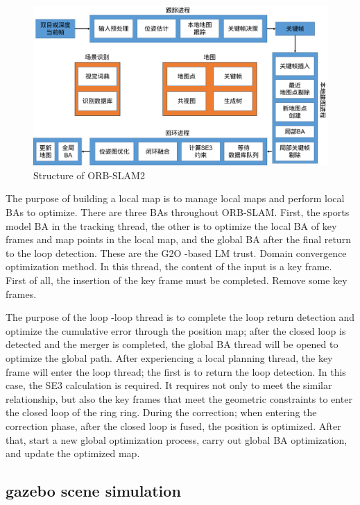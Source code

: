 \documentclass[conference]{IEEEtran}
\begin{document}
\begin{figure}[htbp]
    \centerline{\includegraphics[width=0.9\columnwidth]{ORBstructure.png}}
    \caption{Structure of ORB-SLAM2}
\end{figure}

The purpose of building a local map is to manage local maps and perform local BAs to optimize. 
There are three BAs throughout ORB-SLAM. First, the sports model BA in the tracking thread, 
the other is to optimize the local BA of key frames and map points in the local map, 
and the global BA after the final return to the loop detection. These are the G2O -based LM trust. 
Domain convergence optimization method. In this thread, the content of the input is a key frame. 
First of all, 
the insertion of the key frame must be completed. Remove some key frames.

The purpose of the loop -loop thread is to complete the loop return detection and optimize the cumulative error through the position map; 
after the closed loop is detected and the merger is completed, 
the global BA thread will be opened to optimize the global path. 
After experiencing a local planning thread, the key frame will enter the loop thread; 
the first is to return the loop detection. In this case, the SE3 calculation is required. 
It requires not only to meet the similar relationship, 
but also the key frames that meet the geometric constraints to enter the closed loop of the ring ring. 
During the correction; when entering the correction phase, after the closed loop is fused, the position is optimized. 
After that, start a new global optimization process,
 carry out global BA optimization, and update the optimized map.

\subsection{gazebo scene simulation}
\end{document}
